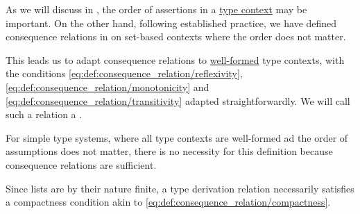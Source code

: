 \begin{definition}\label{def:type_derivation_relation}\mimprovised
  As we will discuss in , the order of assertions in a \hyperref[def:type_context]{type context} may be important. On the other hand, following established practice, we have defined consequence relations in  on set-based contexts where the order does not matter.

  This leads us to adapt consequence relations to \hyperref[rem:well_formed_context]{well-formed} type contexts, with the conditions \eqref{eq:def:consequence_relation/reflexivity}, \eqref{eq:def:consequence_relation/monotonicity} and \eqref{eq:def:consequence_relation/transitivity} adapted straightforwardly. We will call such a relation a .
\end{definition}
\begin{comments}
  \item For simple type systems, where all type contexts are well-formed ad the order of assumptions does not matter, there is no necessity for this definition because consequence relations are sufficient.

  \item Since lists are by their nature finite, a type derivation relation necessarily satisfies a compactness condition akin to \eqref{eq:def:consequence_relation/compactness}.
\end{comments}

